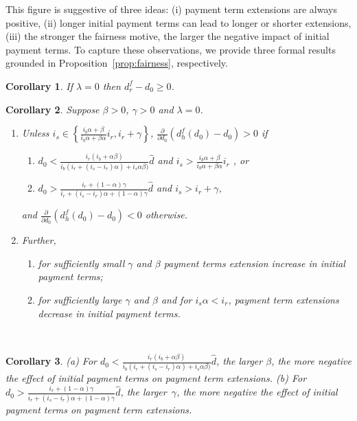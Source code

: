 \documentclass[a4paper,11pt]{article}
\newcommand{\dref}{\widehat d}
\renewcommand{\~}[1]{\tilde{#1}}
\renewcommand{\-}[1]{\overline{#1}}
\newtheorem{corollary}{Corollary}
\begin{document}
This figure is suggestive of three ideas: (i) payment term extensions are always positive, (ii) longer initial payment terms can lead to longer or shorter extensions, (iii) the stronger the fairness motive, the larger the negative impact of initial payment terms. To capture these observations, we provide three formal results grounded in Proposition~\ref{prop:fairness}, respectively.
\begin{corollary}\label{cor:pos.extensions}\singlespacing
If $\lambda=0$ then $d^{f}_r - d_0 \geq 0$.%
\end{corollary}
\newpage
\begin{corollary}\label{cor:ptx.d0}\singlespacing
     Suppose $\beta>0$,  $\gamma>0$ and $\lambda=0$.%
    \begin{enumerate}[label=(\roman*)]
        \item Unless $i_s \in\left\{\frac{i_b \alpha + \beta}{i_b\alpha + \beta\alpha}i_r,i_r + \gamma\right\}$, $\frac{\partial }{\partial d_0}\left(d^f_h\left(d_0\right)-d_0\right)>0$ if
            \begin{enumerate}[label=(\alph*)]
                \item $d_0 < \frac{ i_r (i_b + \alpha \beta)}{  i_b (i_r + \left(i_s- i_r\right) \alpha) + i_s \alpha \beta)}\dref$ and $i_s   >\frac{i_b \alpha + \beta}{i_b\alpha + \beta\alpha}i_r$ , or 
                \item $d_0 >\frac{ i_r + \left(1- \alpha\right) \gamma}{i_r + (i_s-i_r) \alpha + (1-\alpha)\gamma}\dref$ and $ i_s>i_r + \gamma$,
            \end{enumerate}
            and $\frac{\partial }{\partial d_0}\left(d^f_h\left(d_0\right)-d_0\right)<0$  otherwise.
        \item Further,
            \begin{enumerate}[label=(\alph*)]
                 \item for sufficiently small $\gamma$ and $\beta$ payment terms extension increase in initial payment terms;
                 \item for sufficiently large $\gamma$ and $\beta$ and for $i_s\alpha<i_r$, payment term extensions decrease in initial payment terms. 
        \end{enumerate}
    \end{enumerate}     
\end{corollary}%
$\;$\vspace{-60pt}\\
\begin{corollary}\label{cor:relative.fairness}\singlespacing
    (a) For $d_0 < \frac{ i_r (i_b + \alpha \beta)}{  i_b (i_r + \left(i_s- i_r\right) \alpha) + i_s \alpha \beta)}\dref$, the larger $\beta$, the more negative the effect of initial payment terms on payment term extensions. (b) For $d_0 > \frac{ i_r + \left(1- \alpha\right) \gamma}{i_r + (i_s-i_r) \alpha + (1-\alpha)\gamma}\dref$, the larger~$\gamma$, the more negative the effect of initial payment terms on payment term extensions.
\end{corollary}%
%
%
\end{document}
